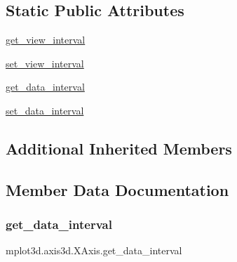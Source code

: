 \subsection*{Static Public Attributes}
\begin{DoxyCompactItemize}
\item 
\hyperlink{classmplot3d_1_1axis3d_1_1XAxis_aa1b8ab7f370ffbbebf9c012862073376}{get\+\_\+view\+\_\+interval}
\item 
\hyperlink{classmplot3d_1_1axis3d_1_1XAxis_a4b5107c029d59f7dc08699221c5a164e}{set\+\_\+view\+\_\+interval}
\item 
\hyperlink{classmplot3d_1_1axis3d_1_1XAxis_ab6b3efe1bea33a4886d5b0e50fc36f7c}{get\+\_\+data\+\_\+interval}
\item 
\hyperlink{classmplot3d_1_1axis3d_1_1XAxis_aa5af89ff1290394b2c5f14db54a1b1e9}{set\+\_\+data\+\_\+interval}
\end{DoxyCompactItemize}
\subsection*{Additional Inherited Members}


\subsection{Member Data Documentation}
\mbox{\label{classmplot3d_1_1axis3d_1_1XAxis_ab6b3efe1bea33a4886d5b0e50fc36f7c}} 
\subsubsection{\texorpdfstring{get\+\_\+data\+\_\+interval}{get\_data\_interval}}
{\footnotesize\ttfamily mplot3d.\+axis3d.\+X\+Axis.\+get\+\_\+data\+\_\+interval\hspace{0.3cm}{\ttfamily [static]}}

\mbox{\label{classmplot3d_1_1axis3d_1_1XAxis_aa1b8ab7f370ffbbebf9c012862073376}} 
